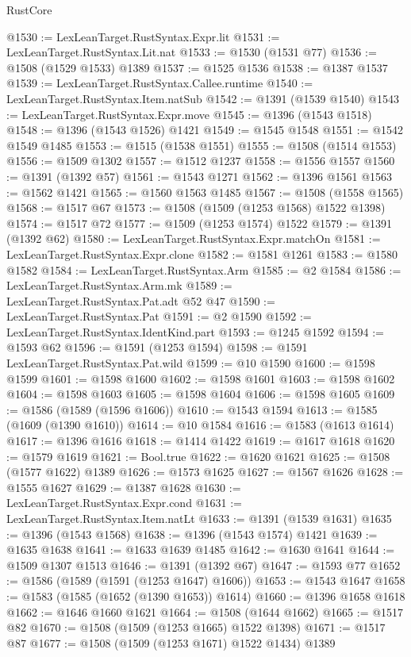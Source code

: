 \begin{lexlean}{RustCore}
\begin{coremodule}
@1530 := LexLeanTarget.RustSyntax.Expr.lit
@1531 := LexLeanTarget.RustSyntax.Lit.nat
@1533 := @1530 (@1531 @77)
@1536 := @1508 (@1529 @1533) @1389
@1537 := @1525 @1536
@1538 := @1387 @1537
@1539 := LexLeanTarget.RustSyntax.Callee.runtime
@1540 := LexLeanTarget.RustSyntax.Item.natSub
@1542 := @1391 (@1539 @1540)
@1543 := LexLeanTarget.RustSyntax.Expr.move
@1545 := @1396 (@1543 @1518)
@1548 := @1396 (@1543 @1526) @1421
@1549 := @1545 @1548
@1551 := @1542 @1549 @1485
@1553 := @1515 (@1538 @1551)
@1555 := @1508 (@1514 @1553)
@1556 := @1509 @1302
@1557 := @1512 @1237
@1558 := @1556 @1557
@1560 := @1391 (@1392 @57)
@1561 := @1543 @1271
@1562 := @1396 @1561
@1563 := @1562 @1421
@1565 := @1560 @1563 @1485
@1567 := @1508 (@1558 @1565)
@1568 := @1517 @67
@1573 := @1508 (@1509 (@1253 @1568) @1522 @1398)
@1574 := @1517 @72
@1577 := @1509 (@1253 @1574) @1522
@1579 := @1391 (@1392 @62)
@1580 := LexLeanTarget.RustSyntax.Expr.matchOn
@1581 := LexLeanTarget.RustSyntax.Expr.clone
@1582 := @1581 @1261
@1583 := @1580 @1582
@1584 := LexLeanTarget.RustSyntax.Arm
@1585 := @2 @1584
@1586 := LexLeanTarget.RustSyntax.Arm.mk
@1589 := LexLeanTarget.RustSyntax.Pat.adt @52 @47
@1590 := LexLeanTarget.RustSyntax.Pat
@1591 := @2 @1590
@1592 := LexLeanTarget.RustSyntax.IdentKind.part
@1593 := @1245 @1592
@1594 := @1593 @62
@1596 := @1591 (@1253 @1594)
@1598 := @1591 LexLeanTarget.RustSyntax.Pat.wild
@1599 := @10 @1590
@1600 := @1598 @1599
@1601 := @1598 @1600
@1602 := @1598 @1601
@1603 := @1598 @1602
@1604 := @1598 @1603
@1605 := @1598 @1604
@1606 := @1598 @1605
@1609 := @1586 (@1589 (@1596 @1606))
@1610 := @1543 @1594
@1613 := @1585 (@1609 (@1390 @1610))
@1614 := @10 @1584
@1616 := @1583 (@1613 @1614)
@1617 := @1396 @1616
@1618 := @1414 @1422
@1619 := @1617 @1618
@1620 := @1579 @1619
@1621 := Bool.true
@1622 := @1620 @1621
@1625 := @1508 (@1577 @1622) @1389
@1626 := @1573 @1625
@1627 := @1567 @1626
@1628 := @1555 @1627
@1629 := @1387 @1628
@1630 := LexLeanTarget.RustSyntax.Expr.cond
@1631 := LexLeanTarget.RustSyntax.Item.natLt
@1633 := @1391 (@1539 @1631)
@1635 := @1396 (@1543 @1568)
@1638 := @1396 (@1543 @1574) @1421
@1639 := @1635 @1638
@1641 := @1633 @1639 @1485
@1642 := @1630 @1641
@1644 := @1509 @1307 @1513
@1646 := @1391 (@1392 @67)
@1647 := @1593 @77
@1652 := @1586 (@1589 (@1591 (@1253 @1647) @1606))
@1653 := @1543 @1647
@1658 := @1583 (@1585 (@1652 (@1390 @1653)) @1614)
@1660 := @1396 @1658 @1618
@1662 := @1646 @1660 @1621
@1664 := @1508 (@1644 @1662)
@1665 := @1517 @82
@1670 := @1508 (@1509 (@1253 @1665) @1522 @1398)
@1671 := @1517 @87
@1677 := @1508 (@1509 (@1253 @1671) @1522 @1434) @1389

\end{coremodule}
\end{lexlean}

